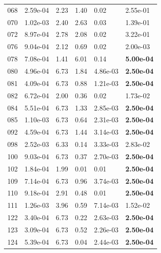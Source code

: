 \begin{figure}[htbp!]
{\begin{minipage}[t]{0.48\linewidth}
\begin{tabular}{llllll}
                    068 & 2.59e-04 & 2.23 & 1.40 & 0.02 & 2.55e-01\\
                    070 & 1.02e-03 & 2.40 & 2.63 & 0.03 & 1.39e-01\\
                    072 & 8.97e-04 & 2.78 & 2.08 & 0.02 & 3.22e-01\\
                    076 & 9.04e-04 & 2.12 & 0.69 & 0.02 & 2.00e-03\\
                    078 & 7.08e-04 & 1.41 & 6.01 & 0.14 & \textbf{5.00e-04}\\
                    080 & 4.96e-04 & 6.73 & 1.84 & 4.86e-03 & \textbf{2.50e-04}\\
                    081 & 4.09e-04 & 6.73 & 0.88 & 1.21e-03 & \textbf{2.50e-04}\\
                    082 & 6.72e-04 & 2.00 & 0.36 & 0.02 & 1.73e-02\\
                    084 & 5.51e-04 & 6.73 & 1.33 & 2.85e-03 & \textbf{2.50e-04}\\
                    085 & 1.10e-03 & 6.73 & 0.64 & 2.31e-03 & \textbf{2.50e-04}\\
                    092 & 4.59e-04 & 6.73 & 1.44 & 3.14e-03 & \textbf{2.50e-04}\\
                    098 & 2.52e-03 & 6.33 & 0.14 & 3.33e-03 & 2.83e-02\\
                    100 & 9.03e-04 & 6.73 & 0.37 & 2.70e-03 & \textbf{2.50e-04}\\
                    102 & 1.84e-04 & 1.99 & 0.01 & 0.01 & \textbf{2.50e-04}\\
                    109 & 7.14e-04 & 6.73 & 0.96 & 3.74e-03 & \textbf{2.50e-04}\\
                    110 & 9.18e-04 & 2.91 & 0.48 & 0.01 & \textbf{2.50e-04}\\
                    111 & 1.26e-03 & 3.96 & 0.59 & 7.14e-03 & 1.52e-02\\
                    122 & 3.40e-04 & 6.73 & 0.22 & 2.63e-03 & \textbf{2.50e-04}\\
                    123 & 3.09e-04 & 6.73 & 0.52 & 2.26e-03 & \textbf{2.50e-04}\\
                    124 & 5.39e-04 & 6.73 & 0.04 & 2.44e-03 & \textbf{2.50e-04}\\
        \bottomrule
        \end{tabular}
    \end{minipage}
    \hspace{0.02\linewidth}
    \begin{minipage}[t]{0.48\linewidth}

\end{minipage}}
\end{figure}
